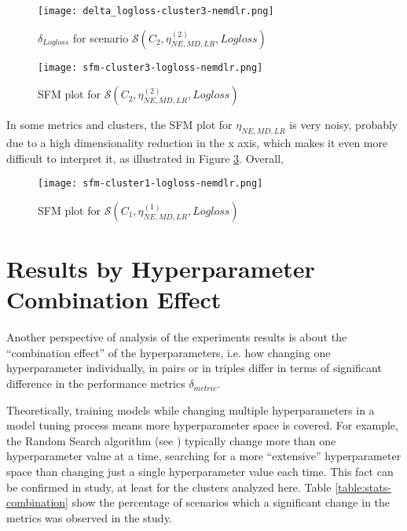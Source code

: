 \begin{figure}[H]
    \centering
    \texttt{[image: delta\_logloss-cluster3-nemdlr.png]}
    \caption{$\delta_{Logloss}$ for scenario $\mathcal{S}(C_2, \eta^{(2)}_{NE, MD, LR}, Logloss)$}
    \label{fig:delta-nemdlr-1}
\end{figure}

\begin{figure}[H]
    \centering
    \texttt{[image: sfm-cluster3-logloss-nemdlr.png]}
    \caption{SFM plot for $\mathcal{S}(C_2, \eta^{(2)}_{NE, MD, LR}, Logloss)$}
    \label{fig:sfm-nemdlr-1}
\end{figure}

In some metrics and clusters, the SFM plot for $\eta_{NE, MD, LR}$ is very noisy, probably due to a high dimensionality reduction in the x axis, which makes it even more difficult to interpret it, as illustrated in Figure \ref{fig:sfm-nemdlr-2}. Overall, 

\begin{figure}[H]
    \centering
    \texttt{[image: sfm-cluster1-logloss-nemdlr.png]}
    \caption{SFM plot for $\mathcal{S}(C_1, \eta^{(1)}_{NE, MD, LR}, Logloss)$}
    \label{fig:sfm-nemdlr-2}
\end{figure}

\section{Results by Hyperparameter Combination Effect}

Another perspective of analysis of the experiments results is about the ``combination effect'' of the hyperparameters, i.e. how changing one hyperparameter individually, in pairs or in triples differ in terms of significant difference in the performance metrics $\delta_{metric}$.

Theoretically, training models while changing multiple hyperparameters in a model tuning process means more hyperparameter space is covered. For example, the Random Search algorithm (see \cite{probst2018tunability}) typically change more than one hyperparameter value at a time, searching for a more ``extensive'' hyperparameter space than changing just a single hyperparameter value each time. This fact can be confirmed in study, at least for the clusters analyzed here. Table \ref{table:stats-combination} show the percentage of scenarios which a significant change in the metrics was observed in the study.


